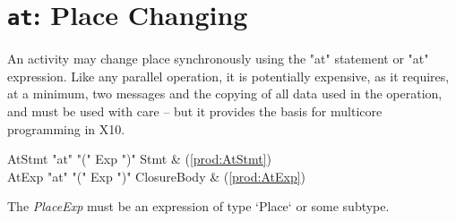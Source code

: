 \section{ {\tt at}: Place Changing}\label{AtStatement}

An activity may change place synchronously using the \xcd"at" statement or
\xcd"at" expression. Like any parallel operation, it is 
potentially expensive, as it requires, at a minimum, two messages
and the copying of all data used in the operation, and must be used with care
-- but it provides the basis for multicore programming in X10.

\begin{bbgrammar}
              AtStmt \: \xcd"at" \xcd"(" Exp \xcd")" Stmt & (\ref{prod:AtStmt}) \\
               AtExp \: \xcd"at" \xcd"(" Exp \xcd")" ClosureBody & (\ref{prod:AtExp}) \\
\end{bbgrammar}

The {\it PlaceExp} must be an expression of type \xcd`Place` or some subtype.




